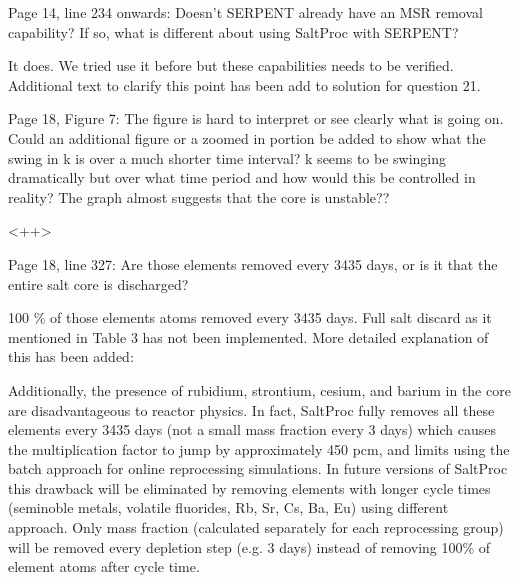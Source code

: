 \documentclass[answers,11pt]{exam}
\begin{document}
\begin{questions}
        \question  Page 14, line 234 onwards: Doesn't SERPENT already have an 
        MSR removal capability? If so, what is different about using SaltProc 
        with SERPENT?
        \begin{solution}
                It does. We tried use it before but these capabilities needs 
                to be verified. Additional text to clarify this point has 
                been add to solution for question 21.                
        \end{solution}

        \question  Page 18, Figure 7: The figure is hard to interpret or see 
        clearly what is going on. Could an additional figure or a zoomed in 
        portion be added to show what the swing in k is over a much shorter 
        time interval? k seems to be swinging dramatically but over what time 
        period and how would this be controlled in reality? The graph almost 
        suggests that the core is unstable??
        \begin{solution}
                <++>
        \end{solution}

        \question  Page 18, line 327: Are those elements removed every 3435 
        days, or is it that the entire salt core is discharged?
        \begin{solution}
		        100 \% of those elements atoms removed every 3435 days. Full salt discard
		         as it mentioned in Table 3 has not been implemented. More detailed 
		         explanation of this has been added:
        
		        Additionally, the presence of rubidium, strontium, cesium, and barium in
		         the core are disadvantageous to reactor physics. In fact, SaltProc fully 
		         removes all these elements every 3435 days (not a small mass fraction 
		         every 3 days) which causes the multiplication factor to jump by 
		        approximately 450 pcm, and limits using the batch approach for online 
		        reprocessing simulations. In future versions of SaltProc this drawback 
		        will be eliminated by removing elements with longer cycle times (seminoble 
		        metals, volatile fluorides, Rb, Sr, Cs, Ba, Eu) using different approach. 
		        Only mass fraction (calculated separately for each reprocessing group) 
		        will be removed every depletion step (e.g. 3 days) instead of removing 
		        100\% of element atoms after cycle time. 
        \end{solution}


\end{questions}
\end{document}
